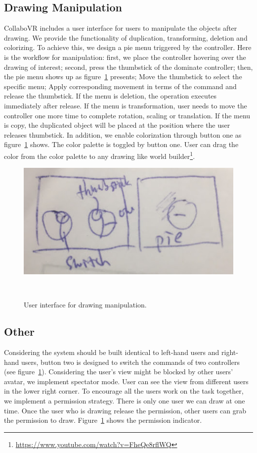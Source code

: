\documentclass{sigchi}
\begin{document}
\subsection{Drawing Manipulation}
CollaboVR includes a user interface for users to manipulate the objects after drawing. We provide the functionality of duplication, transforming, deletion and colorizing. To achieve this, we design a pie menu triggered by the controller. Here is the workflow for manipulation: first, we place the controller hovering over the drawing of interest; second, press the thumbstick of the dominate controller; then, the pie menu shows up as figure~\ref{fig:userinterface} presents; Move the thumbstick to select the specific menu; Apply corresponding movement in terms of the command and release the thumbstick. If the menu is deletion, the operation executes immediately after release. If the menu is transformation, user needs to move the controller one more time to complete rotation, scaling or translation. If the menu is copy, the duplicated object will be placed at the position where the user releases thumbstick. In addition, we enable colorization through button one as figure~\ref{fig:userinterface} shows. The color palette is toggled by button one. User can drag the color from the color palette to any drawing like world builder\footnote{\url{https://www.youtube.com/watch?v=FheQe8rflWQ}}.

\begin{figure}[tb!]
 \centering
 \includegraphics[width=0.9\columnwidth]{userinterface.jpg}
 \caption{User interface for drawing manipulation.
 }~\label{fig:userinterface}
\end{figure}

\subsection{Other}
Considering the system should be built identical to left-hand users and right-hand users, button two is designed to switch the commands of two controllers (see figure~\ref{fig:userinterface}). Considering the user's view might be blocked by other users' avatar, we implement spectator mode. User can see the view from different users in the lower right corner. To encourage all the users work on the task together, we implement a permission strategy. There is only one user we can draw at one time. Once the user who is drawing release the permission, other users can grab the permission to draw. Figure~\ref{fig:userinterface} shows the permission indicator.
\end{document}
